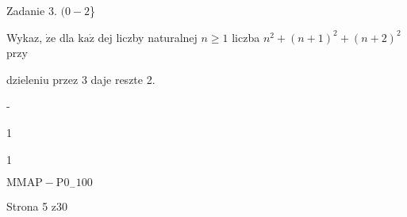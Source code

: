 \documentclass[a4paper,12pt]{article}
\begin{document}
Zadanie 3. $(0-2$\}

Wykaz, $\dot{\mathrm{z}}\mathrm{e}$ dla $\mathrm{k}\mathrm{a}\dot{\mathrm{z}}$ dej liczby naturalnej $n\geq 1$ liczba $n^{2}+(n+1)^{2}+(n+2)^{2}$ przy

dzieleniu przez 3 daje reszte 2.

-

1

1

$\mathrm{M}\mathrm{M}\mathrm{A}\mathrm{P}-\mathrm{P}0_{-}100$

Strona 5 z30
\end{document}
